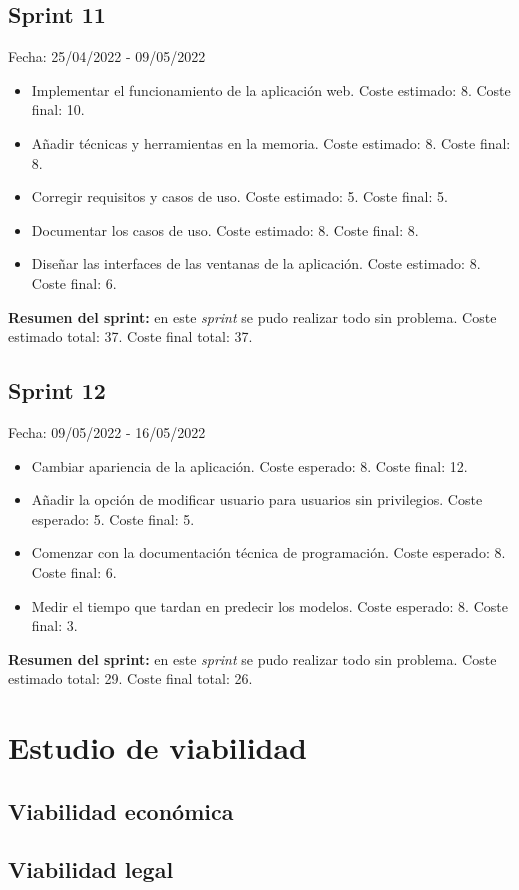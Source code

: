 \subsection{Sprint 11}
Fecha: 25/04/2022 - 09/05/2022
\begin{itemize}
	\item Implementar el funcionamiento de la aplicación web. Coste estimado: 8. Coste final: 10.
	\item Añadir técnicas y herramientas en la memoria. Coste estimado: 8. Coste final: 8.
	\item Corregir requisitos y casos de uso. Coste estimado: 5. Coste final: 5.
	\item Documentar los casos de uso. Coste estimado: 8. Coste final: 8.
	\item Diseñar las interfaces de las ventanas de la aplicación. Coste estimado: 8. Coste final: 6.
\end{itemize}

\textbf{Resumen del sprint:} en este \textit{sprint} se pudo realizar todo sin problema. Coste estimado total: 37. Coste final total: 37.

\subsection{Sprint 12}
Fecha: 09/05/2022 - 16/05/2022
\begin{itemize}
	\item Cambiar apariencia de la aplicación. Coste esperado: 8. Coste final: 12.
	\item Añadir la opción de modificar usuario para usuarios sin privilegios. Coste esperado: 5. Coste final: 5.
	\item Comenzar con la documentación técnica de programación. Coste esperado: 8. Coste final: 6.
	\item Medir el tiempo que tardan en predecir los modelos. Coste esperado: 8. Coste final: 3.
\end{itemize}

\textbf{Resumen del sprint:} en este \textit{sprint} se pudo realizar todo sin problema. Coste estimado total: 29. Coste final total: 26.

\section{Estudio de viabilidad}

\subsection{Viabilidad económica}

\subsection{Viabilidad legal}

